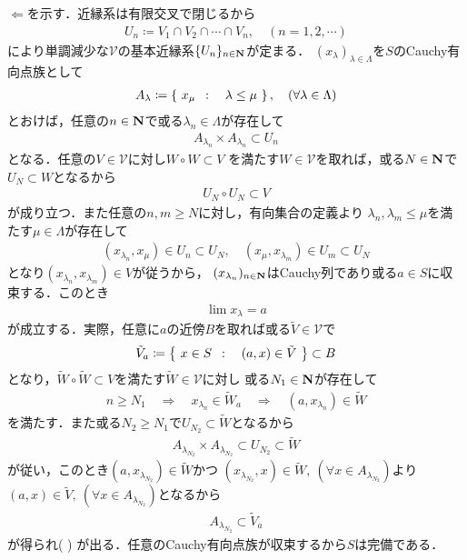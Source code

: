 	\begin{prf}
		$\Longleftarrow$を示す．近縁系は有限交叉で閉じるから
		\begin{align}
			U_n \coloneqq V_1 \cap V_2 \cap \cdots \cap V_n,
			\quad (n = 1,2,\cdots)
		\end{align}
		により単調減少な$\mathscr{V}$の基本近縁系$\{U_n\}_{n \in \mathbf{N}}$が定まる．
		$(x_\lambda)_{\lambda \in \Lambda}$を$S$のCauchy有向点族として
		\begin{align}
			A_\lambda \coloneqq \left\{\ x_\mu\ \, : \quad \lambda \leq \mu\ \right\},
			\quad (\forall \lambda \in \Lambda)
		\end{align}
		とおけば，任意の$n \in \mathbf{N}$で或る$\lambda_n \in \Lambda$が存在して
		\begin{align}
			A_{\lambda_n} \times A_{\lambda_n} \subset U_n
		\end{align}
		となる．任意の$V \in \mathscr{V}$に対し$W \circ W \subset V$
		を満たす$W \in \mathscr{V}$を取れば，或る$N \in \mathbf{N}$で$U_N \subset W$となるから
		\begin{align}
			U_N \circ U_N \subset V
		\end{align}
		が成り立つ．また任意の$n,m \geq N$に対し，有向集合の定義より
		$\lambda_n,\lambda_m \leq \mu$を満たす$\mu \in \Lambda$が存在して
		\begin{align}
			(x_{\lambda_n},x_\mu) \in U_n \subset U_N,
			\quad (x_\mu, x_{\lambda_m}) \in U_m \subset U_N
		\end{align}
		となり$(x_{\lambda_n},x_{\lambda_m}) \in V$が従うから，
		$(x_{\lambda_n})_{n \in \mathbf{N}}$はCauchy列であり或る$a \in S$に収束する．このとき
		\begin{align}
			\lim x_\lambda = a
			\label{eq:thm_complete_iff_every_Cauchy_seq_converges_if_entourage_contains_some_countable_subset}
		\end{align}
		が成立する．実際，任意に$a$の近傍$B$を取れば或る$\tilde{V} \in \mathscr{V}$で
		\begin{align}
			\tilde{V}_a \coloneqq \left\{\ x \in S\ \, : \quad (a,x) \in \tilde{V}\ \right\} \subset B
		\end{align}
		となり，$\tilde{W} \circ \tilde{W} \subset V$を満たす$\tilde{W} \in \mathscr{V}$に対し
		或る$N_1 \in \mathbf{N}$が存在して
		\begin{align}
			n \geq N_1 \quad \Longrightarrow \quad
			x_{\lambda_n} \in \tilde{W}_a \quad \Longrightarrow \quad
			(a,x_{\lambda_n}) \in \tilde{W}
		\end{align}
		を満たす．また或る$N_2 \geq N_1$で$U_{N_2} \subset \tilde{W}$となるから
		\begin{align}
			A_{\lambda_{N_2}} \times A_{\lambda_{N_2}} \subset U_{N_2} \subset \tilde{W}
		\end{align}
		が従い，このとき$(a,x_{\lambda_{N_2}}) \in \tilde{W}$かつ
		$(x_{\lambda_{N_2}},x) \in \tilde{W},\ (\forall x \in A_{\lambda_{N_2}})$より
		$(a,x) \in \tilde{V},\ (\forall x \in A_{\lambda_{N_2}})$となるから
		\begin{align}
			A_{\lambda_{N_2}} \subset \tilde{V}_a 
		\end{align}
		が得られ(
		)
		が出る．任意のCauchy有向点族が収束するから$S$は完備である．
		\QED
	\end{prf}
	
